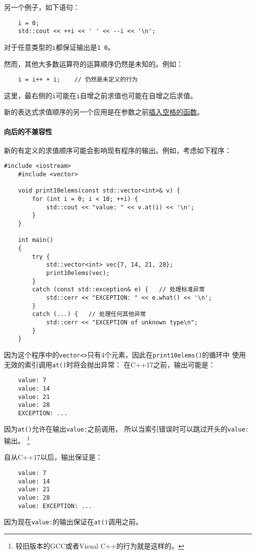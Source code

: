 另一个例子，如下语句：
\begin{lstlisting}
    i = 0;
    std::cout << ++i << ' ' << --i << '\n';
\end{lstlisting}
对于任意类型的\texttt{i}都保证输出是\texttt{1 0}。

然而，其他大多数运算符的运算顺序仍然是未知的。例如：
\begin{lstlisting}
    i = i++ + i;    // 仍然是未定义的行为
\end{lstlisting}
这里，最右侧的\texttt{i}可能在\texttt{i}自增之前求值也可能在自增之后求值。

新的表达式求值顺序的另一个应用是在参数之前\hyperref[ch11.2.1]{插入空格的函数}。

\paragraph{向后的不兼容性}
新的有定义的求值顺序可能会影响现有程序的输出。例如，考虑如下程序：
\begin{lstlisting}[frame=single, title=lang/evalexcept.cpp]
    #include <iostream>
    #include <vector>

    void print10elems(const std::vector<int>& v) {
        for (int i = 0; i < 10; ++i) {
            std::cout << "value: " << v.at(i) << '\n';
        }
    }

    int main()
    {
        try {
            std::vector<int> vec{7, 14, 21, 28};
            print10elems(vec);
        }
        catch (const std::exception& e) {   // 处理标准异常
            std::cerr << "EXCEPTION: " << e.what() << '\n';
        }
        catch (...) {   // 处理任何其他异常
            std::cerr << "EXCEPTION of unknown type\n";
        }
    }
\end{lstlisting}
因为这个程序中的\texttt{vector<>}只有4个元素，因此在\texttt{print10elems()}的循环中
使用无效的索引调用\texttt{at()}时将会抛出异常：
在C++17之前，输出可能是：
\begin{lstlisting}
    value: 7
    value: 14
    value: 21
    value: 28
    EXCEPTION: ...
\end{lstlisting}
因为\texttt{at()}允许在输出\texttt{value:}之前调用，
所以当索引错误时可以跳过开头的\texttt{value:}输出。
\footnote{较旧版本的GCC或者Visual C++的行为就是这样的。}

自从C++17以后，输出保证是：
\begin{lstlisting}
    value: 7
    value: 14
    value: 21
    value: 28
    value: EXCEPTION: ...
\end{lstlisting}
因为现在\texttt{value:}的输出保证在\texttt{at()}调用之前。

